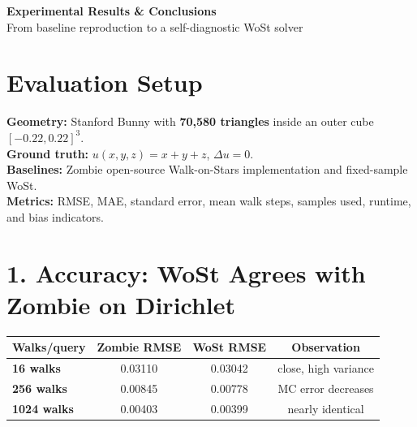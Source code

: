 \documentclass[11pt]{article}
\begin{document}
\newpage

\begin{center}
  {\LARGE\bfseries\color{accent} Experimental Results \& Conclusions}\\[4pt]
  {\large From baseline reproduction to a self-diagnostic WoSt solver}
\end{center}

\vspace{6pt}

\section{Evaluation Setup}

\begin{tcolorbox}[colback=lightbg,colframe=accent,boxrule=0.5pt,arc=2pt,left=6pt,right=6pt,top=4pt,bottom=4pt]
\textbf{Geometry:} Stanford Bunny with \textbf{70,580 triangles} inside an outer cube $[-0.22,0.22]^3$.\\
\textbf{Ground truth:} $u(x,y,z)=x+y+z$, $\Delta u=0$.\\
\textbf{Baselines:} Zombie open-source Walk-on-Stars implementation and fixed-sample WoSt.\\
\textbf{Metrics:} RMSE, MAE, standard error, mean walk steps, samples used, runtime, and bias indicators.
\end{tcolorbox}

\section{1. Accuracy: WoSt Agrees with Zombie on Dirichlet}

\begin{center}
\begin{tabular}{>{\bfseries}lccc}
\toprule
Walks/query & Zombie RMSE & WoSt RMSE & Observation\\
\midrule
16 walks   & 0.03110 & 0.03042 & close, high variance\\
256 walks  & 0.00845 & 0.00778 & MC error decreases\\
1024 walks & 0.00403 & 0.00399 & nearly identical\\
\bottomrule
\end{tabular}
\end{center}
\end{document}
